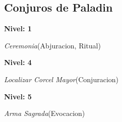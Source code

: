 \documentclass[a4paper,twocolumn,openany,10pt]{dndbook}
\begin{document}
\subsection*{Conjuros de Paladin}
\begin{list}{}{}
	\item \textbf{Nivel: 1}
	\begin{list}{}{}
		\item \textit{Ceremonia}(Abjuracion, Ritual)
	\end{list}

	\item \textbf{Nivel: 4}
	\begin{list}{}{}
		\item \textit{Localizar Corcel Mayor}(Conjuracion)
	\end{list}

	\item \textbf{Nivel: 5}
	\begin{list}{}{}
		\item \textit{Arma Sagrada}(Evocacion)
	\end{list}

\end{list}
\end{document}
